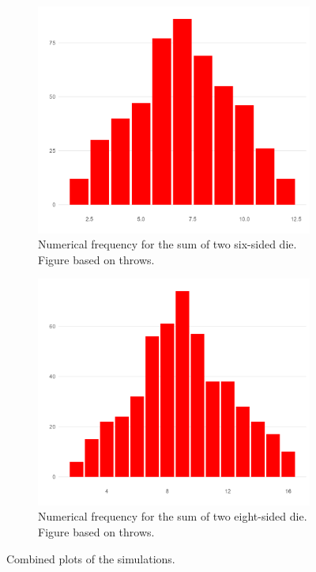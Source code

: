 \documentclass[12pt]{article}
\theoremstyle{definition}
\begin{document}
\begin{figure}[tbh!]
\begin{subfigure}{.5\textwidth}
  \centering
  \includegraphics[width=.8\linewidth]{plot/baseline/hist_red.png}  
  \caption{Numerical frequency for the sum of two six-sided die. Figure based on throws.}
  \label{fig:sub-first}
\end{subfigure}
\begin{subfigure}{.5\textwidth}
  \centering
  \includegraphics[width=.8\linewidth]{plot/500_8/hist_red.png}  
  \caption{Numerical frequency for the sum of two eight-sided die. Figure based on throws.}
  \label{fig:sub-second}
\end{subfigure}
\caption{Combined plots of the simulations.}
\label{fig:figsubplots}
\end{figure}
\end{document}
